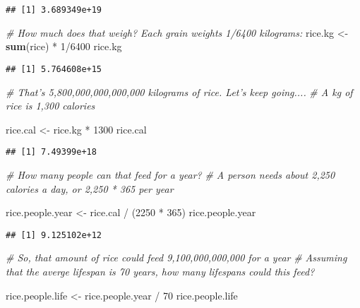 \documentclass[]{book}
\newenvironment{Shaded}{\begin{snugshade}}{\end{snugshade}}
\newcommand{\KeywordTok}[1]{\textcolor[rgb]{0.13,0.29,0.53}{\textbf{{#1}}}}
\newcommand{\DecValTok}[1]{\textcolor[rgb]{0.00,0.00,0.81}{{#1}}}
\newcommand{\StringTok}[1]{\textcolor[rgb]{0.31,0.60,0.02}{{#1}}}
\newcommand{\CommentTok}[1]{\textcolor[rgb]{0.56,0.35,0.01}{\textit{{#1}}}}
\newcommand{\NormalTok}[1]{{#1}}
\begin{document}
\begin{verbatim}
## [1] 3.689349e+19
\end{verbatim}

\begin{Shaded}
\begin{Highlighting}[]
\CommentTok{# How much does that weigh? Each grain weights 1/6400 kilograms:}
\NormalTok{rice.kg <-}\StringTok{ }\KeywordTok{sum}\NormalTok{(rice) *}\StringTok{ }\DecValTok{1}\NormalTok{/}\DecValTok{6400}
\NormalTok{rice.kg}
\end{Highlighting}
\end{Shaded}

\begin{verbatim}
## [1] 5.764608e+15
\end{verbatim}

\begin{Shaded}
\begin{Highlighting}[]
\CommentTok{# That's 5,800,000,000,000,000 kilograms of rice. Let's keep going....}
\CommentTok{# A kg of rice is 1,300 calories}

\NormalTok{rice.cal <-}\StringTok{ }\NormalTok{rice.kg *}\StringTok{ }\DecValTok{1300}
\NormalTok{rice.cal}
\end{Highlighting}
\end{Shaded}

\begin{verbatim}
## [1] 7.49399e+18
\end{verbatim}

\begin{Shaded}
\begin{Highlighting}[]
\CommentTok{# How many people can that feed for a year?}
\CommentTok{# A person needs about 2,250 calories a day, or 2,250 * 365 per year}

\NormalTok{rice.people.year <-}\StringTok{ }\NormalTok{rice.cal /}\StringTok{ }\NormalTok{(}\DecValTok{2250} \NormalTok{*}\StringTok{ }\DecValTok{365}\NormalTok{)}
\NormalTok{rice.people.year}
\end{Highlighting}
\end{Shaded}

\begin{verbatim}
## [1] 9.125102e+12
\end{verbatim}

\begin{Shaded}
\begin{Highlighting}[]
\CommentTok{# So, that amount of rice could feed 9,100,000,000,000 for a year}
\CommentTok{# Assuming that the averge lifespan is 70 years, how many lifespans could this feed?}

\NormalTok{rice.people.life <-}\StringTok{ }\NormalTok{rice.people.year /}\StringTok{ }\DecValTok{70}
\NormalTok{rice.people.life}
\end{Highlighting}
\end{Shaded}
\end{document}
